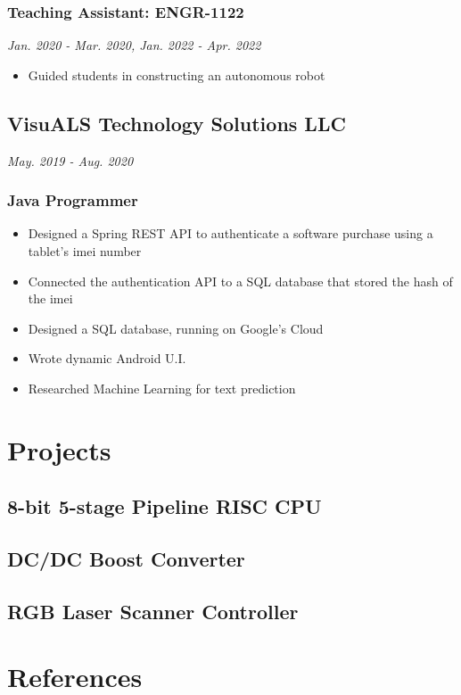\documentclass{article}
\begin{document}
\begin{spacing}{.5}
		\subsubsection{\small{Teaching Assistant: ENGR-1122}} \hfill \scriptsize{\textsl{Jan. 2020 - Mar. 2020, Jan. 2022 - Apr. 2022}}
			\begin{itemize}[label=--,itemsep=-.75ex]
				\item \small{Guided students in constructing an autonomous robot}
			\end{itemize}
	\subsection{VisuALS Technology Solutions LLC} \hfill \scriptsize{\textsl{May. 2019 - Aug. 2020}}
		\subsubsection{\small{Java Programmer}}
			\begin{itemize}[label=--,itemsep=-.75ex]
				\item \small{Designed a Spring REST API to authenticate a software purchase using a tablet's imei number}
				\item \small{Connected the authentication API to a SQL database that stored the hash of the imei}
				\item \small{Designed a SQL database, running on Google's Cloud}
				\item \small{Wrote dynamic Android U.I.}
				\item \small{Researched Machine Learning for text prediction}
			\end{itemize}

\section{Projects}
	\subsection{8-bit 5-stage Pipeline RISC CPU}
	\subsection{DC/DC Boost Converter}
	\subsection{RGB Laser Scanner Controller}

\section{References}

\end{spacing}
\end{document}
